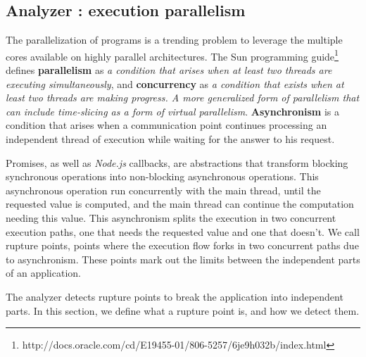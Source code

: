 
\subsection{Analyzer : execution parallelism} \label{section:analyzer}

The parallelization of programs is a trending problem to leverage the multiple cores available on highly parallel architectures.
The Sun programming guide\footnote{\raggedright http://docs.oracle.com/cd/E19455-01/806-5257/6je9h032b/index.html} defines \textbf{parallelism} as \textit{a condition that arises when at least two threads are executing simultaneously}, and \textbf{concurrency} as \textit{a condition that exists when at least two threads are making progress. A more generalized form of parallelism that can include time-slicing as a form of virtual parallelism}.
\textbf{Asynchronism} is a condition that arises when a communication point continues processing an independent thread of execution while waiting for the answer to his request.

Promises\cite{Liskov1988}, as well as \textit{Node.js} callbacks, are abstractions that transform blocking synchronous operations into non-blocking asynchronous operations.
This asynchronous operation run concurrently with the main thread, until the requested value is computed, and the main thread can continue the computation needing this value.
This asynchronism splits the execution in two concurrent execution paths, one that needs the requested value and one that doesn't.
We call rupture points, points where the execution flow forks in two concurrent paths due to asynchronism.
These points mark out the limits between the independent parts of an application.
 
The analyzer detects rupture points to break the application into independent parts.
In this section, we define what a rupture point is, and how we detect them.


